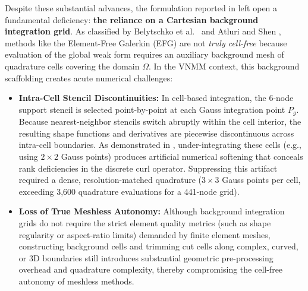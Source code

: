 \documentclass[VANCOUVER,Times1COL]{WileyNJD-v5}
\begin{document}
Despite these substantial advances, the formulation reported in \cite{stable_vnmm2d_2026} left open a fundamental deficiency: \textbf{the reliance on a Cartesian background integration grid}. As classified by Belytschko et al.~\cite{belytschko1994element} and Atluri and Shen \cite{atluri2002meshless}, methods like the Element-Free Galerkin (EFG) are not \textit{truly cell-free} because evaluation of the global weak form requires an auxiliary background mesh of quadrature cells covering the domain $\Omega$. In the VNMM context, this background scaffolding creates acute numerical challenges:
\begin{itemize}
    \item \textbf{Intra-Cell Stencil Discontinuities:} In cell-based integration, the 6-node support stencil is selected point-by-point at each Gauss integration point $P_g$. Because nearest-neighbor stencils switch abruptly within the cell interior, the resulting shape functions and derivatives are piecewise discontinuous across intra-cell boundaries. As demonstrated in \cite{stable_vnmm2d_2026}, under-integrating these cells (e.g., using $2 \times 2$ Gauss points) produces artificial numerical softening that conceals rank deficiencies in the discrete curl operator. Suppressing this artifact required a dense, resolution-matched quadrature ($3 \times 3$ Gauss points per cell, exceeding 3,600 quadrature evaluations for a 441-node grid).
    \item \textbf{Loss of True Meshless Autonomy:} Although background integration grids do not require the strict element quality metrics (such as shape regularity or aspect-ratio limits) demanded by finite element meshes, constructing background cells and trimming cut cells along complex, curved, or 3D boundaries still introduces substantial geometric pre-processing overhead and quadrature complexity, thereby compromising the cell-free autonomy of meshless methods.
\end{itemize}
\end{document}
